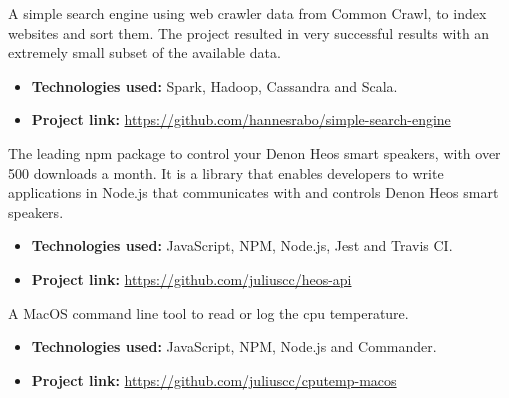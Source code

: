 

A simple search engine using web crawler data from Common Crawl, to index websites and sort them. The project resulted in very successful results with an extremely small subset of the available data.

\vspace{6pt}

\begin{itemize}
    \item \textbf{Technologies used:} Spark, Hadoop, Cassandra and Scala.
    \item \textbf{Project link:} \href{https://github.com/hannesrabo/simple-search-engine}{https://github.com/hannesrabo/simple-search-engine}
\end{itemize}

\divider

The leading npm package to control your Denon Heos smart speakers, with over 500 downloads a month. It is a library that enables developers to write applications in Node.js that communicates with and controls Denon Heos smart speakers.

\vspace{6pt}

\begin{itemize}
    \item \textbf{Technologies used:} JavaScript, NPM, Node.js, Jest and Travis CI.
    \item \textbf{Project link:} \href{https://github.com/juliuscc/heos-api}{https://github.com/juliuscc/heos-api}
\end{itemize}

\divider

A MacOS command line tool to read or log the cpu temperature.

\vspace{6pt}

\begin{itemize}
    \item \textbf{Technologies used:} JavaScript, NPM, Node.js and Commander.
    \item \textbf{Project link:} \href{https://github.com/juliuscc/cputemp-macos}{https://github.com/juliuscc/cputemp-macos}
\end{itemize}

\divider

